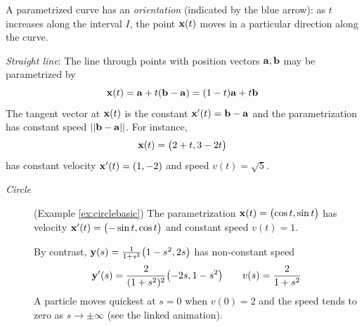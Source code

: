 A parametrized curve has an \emph{orientation} (indicated by the blue arrow): as $t$ increases along the interval $I$, the point ${\mathbf{x}}(t)$ moves in a particular direction along the curve.



\begin{minipage}[t]{0.69\linewidth}\vspace{0pt}
\begin{examples}{}{}
\hangindent\leftmargini
\emph{Straight line}: The line through points with position vectors ${\mathbf{a}},{\mathbf{b}}$ may be parametrized by
\[{\mathbf{x}}(t)={\mathbf{a}}+t({\mathbf{b}}-{\mathbf{a}})=(1-t){\mathbf{a}}+t{\mathbf{b}}\]
The tangent vector at ${\mathbf{x}}(t)$ is the constant ${\mathbf{x}}'(t)={\mathbf{b}}-{\mathbf{a}}$ and the parametrization has constant speed $\left| \left| {\mathbf{b}}-{\mathbf{a}}\right|\right|$. For instance,
\[{\mathbf{x}}(t)=\bigl(2+t,3-2t\bigr)\]
has constant velocity ${\mathbf{x}}'(t)=(1,-2)$ and speed $v(t)=\sqrt 5$.
\begin{description}
  \item[\normalfont\emph{Circle}] (Example \ref{ex:circlebasic}) The parametrization ${\mathbf{x}}(t)=\bigl(\cos t,\sin t\bigr)$ has velocity ${\mathbf{x}}'(t)=\bigl(-\sin t,\cos t\bigr)$ and constant speed $v(t)=1$.\par
  By contrast, ${\mathbf{y}}(s)=\tfrac 1{1+s^2}\bigl(1-s^2,2s\bigr)$ has non-constant speed
  \[{\mathbf{y}}'(s)=\frac 2{(1+s^2)^2}\bigl(-2s,1-s^2\bigr)\qquad v(s)=\frac 2{1+s^2}\]
  A particle moves quickest at $s=0$ when $v(0)=2$ and the speed tends to zero as $s\to\pm\infty$ (see the linked animation).
\end{description}
\end{examples}
\end{minipage}
